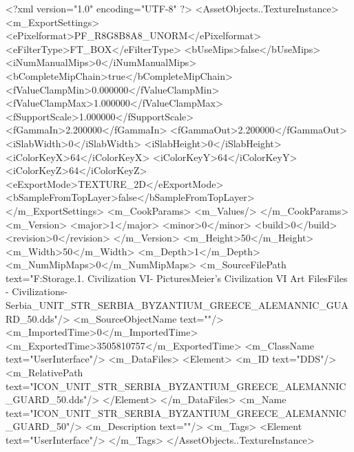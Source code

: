 <?xml version="1.0" encoding="UTF-8" ?>
<AssetObjects..TextureInstance>
	<m_ExportSettings>
		<ePixelformat>PF_R8G8B8A8_UNORM</ePixelformat>
		<eFilterType>FT_BOX</eFilterType>
		<bUseMips>false</bUseMips>
		<iNumManualMips>0</iNumManualMips>
		<bCompleteMipChain>true</bCompleteMipChain>
		<fValueClampMin>0.000000</fValueClampMin>
		<fValueClampMax>1.000000</fValueClampMax>
		<fSupportScale>1.000000</fSupportScale>
		<fGammaIn>2.200000</fGammaIn>
		<fGammaOut>2.200000</fGammaOut>
		<iSlabWidth>0</iSlabWidth>
		<iSlabHeight>0</iSlabHeight>
		<iColorKeyX>64</iColorKeyX>
		<iColorKeyY>64</iColorKeyY>
		<iColorKeyZ>64</iColorKeyZ>
		<eExportMode>TEXTURE_2D</eExportMode>
		<bSampleFromTopLayer>false</bSampleFromTopLayer>
	</m_ExportSettings>
	<m_CookParams>
		<m_Values/>
	</m_CookParams>
	<m_Version>
		<major>1</major>
		<minor>0</minor>
		<build>0</build>
		<revision>0</revision>
	</m_Version>
	<m_Height>50</m_Height>
	<m_Width>50</m_Width>
	<m_Depth>1</m_Depth>
	<m_NumMipMaps>0</m_NumMipMaps>
	<m_SourceFilePath text="F:\Mod Storage\2.1. Civilization VI\Mods\Archive - Pictures\Sid Meier's Civilization VI Art Files\Art Files - Civilizations\Civilization - Serbia\ICON_UNIT_STR_SERBIA_BYZANTIUM_GREECE_ALEMANNIC_GUARD_50.dds"/>
	<m_SourceObjectName text=""/>
	<m_ImportedTime>0</m_ImportedTime>
	<m_ExportedTime>3505810757</m_ExportedTime>
	<m_ClassName text="UserInterface"/>
	<m_DataFiles>
		<Element>
			<m_ID text="DDS"/>
			<m_RelativePath text="ICON_UNIT_STR_SERBIA_BYZANTIUM_GREECE_ALEMANNIC_GUARD_50.dds"/>
		</Element>
	</m_DataFiles>
	<m_Name text="ICON_UNIT_STR_SERBIA_BYZANTIUM_GREECE_ALEMANNIC_GUARD_50"/>
	<m_Description text=""/>
	<m_Tags>
		<Element text="UserInterface"/>
	</m_Tags>
</AssetObjects..TextureInstance>

